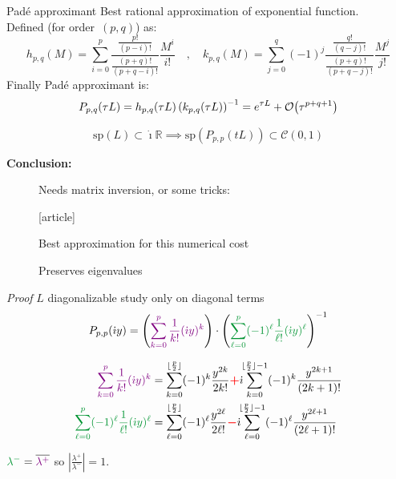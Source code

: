 \documentclass{beamer}
\newcommand{\cmark}{{\color{dgreen}\ding{52}}}
\newcommand{\xmark}{{\color{mred}\ding{55}}}
\newcommand{\arrow}{{\color{PLB}\ding{220}}}
\newcommand{\mbold}[1]{{\textbf{\color{PLB}#1}}}
\newcommand{\customcite}[1]{\cite{#1}}
\newcommand{\Mvb}[1]{\boldsymbol{#1}}
\newcommand{\I}{\dot{\imath}}
\begin{document}
\begin{frame}{Padé approximant}
  Best rational approximation of exponential function. \\
  Defined (for order~$(p,q)$) as:
  $$
      h_{p,q}(M) = \sum_{i=0}^p        \frac{\frac{p!}{(p-i)!}}{\frac{(p+q)!}{(p+q-i)!}} \frac{M^i}{i!} \quad,\quad
      k_{p,q}(M) = \sum_{j=0}^q (-1)^j \frac{\frac{q!}{(q-j)!}}{\frac{(p+q)!}{(p+q-j)!}} \frac{M^j}{j!}
  $$
  Finally Padé approximant is:
  $$
    P_{p,q}(\tau L) = h_{p,q}(\tau L)\left( k_{p,q}(\tau L) \right)^{-1} = e^{\tau L} + \order{\tau^{p+q+1}}
  $$
  \vspace{-0.5cm}
  \begin{theorem}
    $$\text{sp}(L)\subset\I\mathbb{R} \implies \text{sp}(P_{p,p}(tL))\subset\mathcal{C}(0,1)$$
  \end{theorem}

  \mbold{Conclusion:}
  \begin{description}
    \item[\xmark] Needs matrix inversion, or some tricks:
      \vspace{-0.1cm}
      \begin{thebibliography}{9}
        [article]
         \customcite{Li:2011}
      \end{thebibliography}
    \item[\cmark] Best approximation for this numerical cost
    \item[\cmark] Preserves eigenvalues
  \end{description}
\end{frame}
\begin{frame}{\emph{Proof}}
  $L$ diagonalizable \arrow{} study only on diagonal terms
  $$
    P_{p,p}(\I y) = \left( \textcolor{violet}{\sum_{k=0}^p \frac{1}{k!}(\I y)^k} \right)\cdot\left(\textcolor{dgreen}{\sum_{\ell=0}^p (-1)^\ell\frac{1}{\ell!}(\I y)^\ell}\right)^{-1}
  $$

  $$
    \begin{aligned}
      \textcolor{violet}{\sum_{k=0}^p \frac{1}{k!}(\I y)^k}                   &= \sum_{k=0}^{\lfloor\frac{p}{2}\rfloor}    (-1)^k\frac{y^{2k}}{{2k}!}          \textcolor{red}{\Mvb{+}}\I\!\!\sum_{k=0}^{\lfloor\frac{p}{2}\rfloor-1} (-1)^k \frac{y^{2k+1}}{(2k+1)!} \\
      \textcolor{dgreen}{\sum_{\ell=0}^p (-1)^\ell\frac{1}{\ell!}(\I y)^\ell} &= \sum_{\ell=0}^{\lfloor\frac{p}{2}\rfloor} (-1)^\ell\frac{y^{2\ell}}{{2\ell}!} \textcolor{red}{\Mvb{-}}\I\!\!\sum_{\ell=0}^{\lfloor\frac{p}{2}\rfloor-1} (-1)^\ell \frac{y^{2\ell+1}}{(2\ell+1)!}
    \end{aligned}
  $$

  $\textcolor{dgreen}{\lambda^-} = \overline{\textcolor{violet}{\lambda^+}}$ so $\left|\frac{\lambda^+}{\lambda^-}\right|=1$.
\end{frame}
\end{document}
